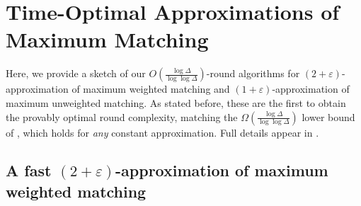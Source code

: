 \documentclass[11pt]{article}
\newcommand{\eps}{\varepsilon}
\begin{document}



\section{Time-Optimal Approximations of Maximum Matching}
Here, we provide a sketch of our $O(\frac{\log \Delta}{\log\log \Delta})$-round algorithms for $(2+\eps)$-approximation of maximum weighted matching and $(1+\eps)$-approximation of maximum unweighted matching.   As stated before, these are the first to obtain the provably optimal round complexity, matching the $\Omega(\frac{\log \Delta}{\log\log \Delta})$ lower bound of \cite{kuhn2006price}, which holds for \emph{any} constant approximation. Full details appear in . 

\subsection{A fast $(2+\eps)$-approximation of maximum weighted matching}\label{lem:NMISmain}
\end{document}

